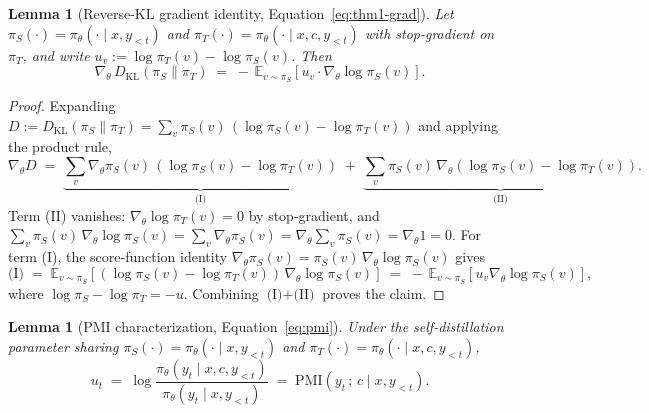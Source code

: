 \documentclass{article}
\newtheorem{lemma}[theorem]{Lemma}
\begin{document}
\begin{lemma}[Reverse-KL gradient identity, Equation~\eqref{eq:thm1-grad}]
  \label{lem:rkl-grad}
  Let $\pi_S(\cdot) = \pi_\theta(\cdot \mid x, y_{<t})$ and $\pi_T(\cdot) = \pi_\theta(\cdot \mid x, c, y_{<t})$ with stop-gradient on $\pi_T$, and write $u_v := \log \pi_T(v) - \log \pi_S(v)$. Then
  \begin{equation*}
    \nabla_\theta\, D_{\mathrm{KL}}(\pi_S \| \pi_T)
    \;=\; -\,\mathbb{E}_{v \sim \pi_S}\!\left[ u_v \cdot \nabla_\theta \log \pi_S(v) \right].
  \end{equation*}
\end{lemma}

\begin{proof}
  Expanding $D := D_{\mathrm{KL}}(\pi_S \| \pi_T) = \sum_v \pi_S(v)\,(\log \pi_S(v) - \log \pi_T(v))$ and applying the product rule,
  \begin{equation*}
    \nabla_\theta D
    \;=\;
    \underbrace{\sum_v \nabla_\theta \pi_S(v)\,(\log \pi_S(v) - \log \pi_T(v))}_{\text{(I)}}
    \;+\;
    \underbrace{\sum_v \pi_S(v)\,\nabla_\theta (\log \pi_S(v) - \log \pi_T(v))}_{\text{(II)}}.
  \end{equation*}
  Term (II) vanishes: $\nabla_\theta \log \pi_T(v) = 0$ by stop-gradient, and $\sum_v \pi_S(v)\,\nabla_\theta \log \pi_S(v) = \sum_v \nabla_\theta \pi_S(v) = \nabla_\theta \sum_v \pi_S(v) = \nabla_\theta 1 = 0$. For term (I), the score-function identity $\nabla_\theta \pi_S(v) = \pi_S(v)\,\nabla_\theta \log \pi_S(v)$ gives
  \begin{equation*}
    \text{(I)} \;=\; \mathbb{E}_{v \sim \pi_S}\!\left[(\log \pi_S(v) - \log \pi_T(v))\,\nabla_\theta \log \pi_S(v)\right] \;=\; -\,\mathbb{E}_{v \sim \pi_S}\!\left[u_v \nabla_\theta \log \pi_S(v)\right],
  \end{equation*}
  where $\log \pi_S - \log \pi_T = -u$. Combining $\text{(I)} + \text{(II)}$ proves the claim.
\end{proof}

\begin{lemma}[PMI characterization, Equation~\eqref{eq:pmi}]
  \label{lem:pmi}
  Under the self-distillation parameter sharing $\pi_S(\cdot) = \pi_\theta(\cdot \mid x, y_{<t})$ and $\pi_T(\cdot) = \pi_\theta(\cdot \mid x, c, y_{<t})$,
  \begin{equation*}
    u_t \;=\; \log \frac{\pi_\theta(y_t \mid x, c, y_{<t})}{\pi_\theta(y_t \mid x, y_{<t})} \;=\; \mathrm{PMI}(y_t\,;\, c \mid x, y_{<t}).
  \end{equation*}
\end{lemma}
\end{document}
